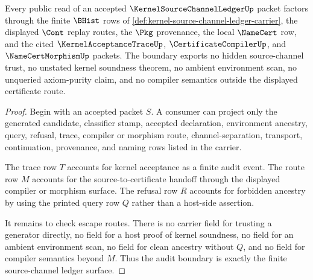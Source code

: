 \begin{theorem}
\label{thm:kernel-source-channel-ledger-audit-boundary}
Every public read of an accepted $\KernelSourceChannelLedgerUp$ packet factors through the finite $\BHist$ rows of \autoref{def:kernel-source-channel-ledger-carrier}, the displayed $\Cont$ replay routes, the $\Pkg$ provenance, the local $\NameCert$ row, and the cited $\KernelAcceptanceTraceUp$, $\CertificateCompilerUp$, and $\NameCertMorphismUp$ packets. The boundary exports no hidden source-channel trust, no unstated kernel soundness theorem, no ambient environment scan, no unqueried axiom-purity claim, and no compiler semantics outside the displayed certificate route.
\end{theorem}
\begin{proof}
Begin with an accepted packet $S$. A consumer can project only the generated candidate, classifier stamp, accepted declaration, environment ancestry, query, refusal, trace, compiler or morphism route, channel-separation, transport, continuation, provenance, and naming rows listed in the carrier.

The trace row $T$ accounts for kernel acceptance as a finite audit event. The route row $M$ accounts for the source-to-certificate handoff through the displayed compiler or morphism surface. The refusal row $R$ accounts for forbidden ancestry by using the printed query row $Q$ rather than a host-side assertion.

It remains to check escape routes. There is no carrier field for trusting a generator directly, no field for a host proof of kernel soundness, no field for an ambient environment scan, no field for clean ancestry without $Q$, and no field for compiler semantics beyond $M$. Thus the audit boundary is exactly the finite source-channel ledger surface.
\end{proof}

